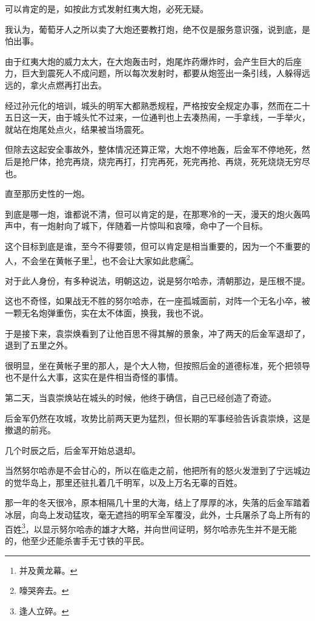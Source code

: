 \begin{multicols}{\theparacolNo}
		可以肯定的是，如按此方式发射红夷大炮，必死无疑。

		我认为，葡萄牙人之所以卖了大炮还要教打炮，绝不仅是服务意识强，说到底，是怕出事。

		由于红夷大炮的威力太大，在大炮轰击时，炮尾炸药爆炸时，会产生巨大的后座力，巨大到震死人不成问题，所以每次发射时，都要从炮签出一条引线，人躲得远远的，拿火点燃再打出去。

		经过孙元化的培训，城头的明军大都熟悉规程，严格按安全规定办事，然而在二十五日这一天，由于城头忙不过来，一位通判也上去凑热闹，一手拿线，一手举火，就站在炮尾处点火，结果被当场震死。

		但除去这起安全事故外，整体情况还算正常，大炮不停地轰，后金军不停地死，然后是抢尸体，抢完再烧，烧完再打，打完再死，死完再抢、再烧，死死烧烧无穷尽也。

		直至那历史性的一炮。

		到底是哪一炮，谁都说不清，但可以肯定的是，在那寒冷的一天，漫天的炮火轰鸣声中，有一炮射向了城下，伴随着一片惊叫和哀嚎，命中了一个目标。

		这个目标到底是谁，至今不得要领，但可以肯定是相当重要的，因为一个不重要的人，不会坐在黄帐子里\footnote{并及黄龙幕。}，也不会让大家如此悲痛\footnote{嚎哭奔去。}。

		对于此人身份，有多种说法，明朝这边，说是努尔哈赤，清朝那边，是压根不提。

		这也不奇怪，如果战无不胜的努尔哈赤，在一座孤城面前，对阵一个无名小卒，被一颗无名炮弹重伤，实在太不体面，换我，我也不说。

		于是接下来，袁崇焕看到了让他百思不得其解的景象，冲了两天的后金军退却了，退到了五里之外。

		很明显，坐在黄帐子里的那人，是个大人物，但按照后金的道德标准，死个把领导也不是什么大事，这实在是件相当奇怪的事情。

		第二天，当袁崇焕站在城头的时候，他终于确信，自己已经创造了奇迹。

		后金军仍然在攻城，攻势比前两天更为猛烈，但长期的军事经验告诉袁崇焕，这是撤退的前兆。

		几个时辰之后，后金军开始总退却。

		当然努尔哈赤是不会甘心的，所以在临走之前，他把所有的怒火发泄到了宁远城边的觉华岛上，那里还驻扎着几千明军，以及上万名无辜的百姓。

		那一年的冬天很冷，原本相隔几十里的大海，结上了厚厚的冰，失落的后金军踏着冰层，向岛上发动猛攻，毫无遮挡的明军全军覆没，此外，士兵屠杀了岛上所有的百姓\footnote{逢人立碎。}，以显示努尔哈赤的雄才大略，并向世间证明，努尔哈赤先生并不是无能的，他至少还能杀害手无寸铁的平民。


\end{multicols}
